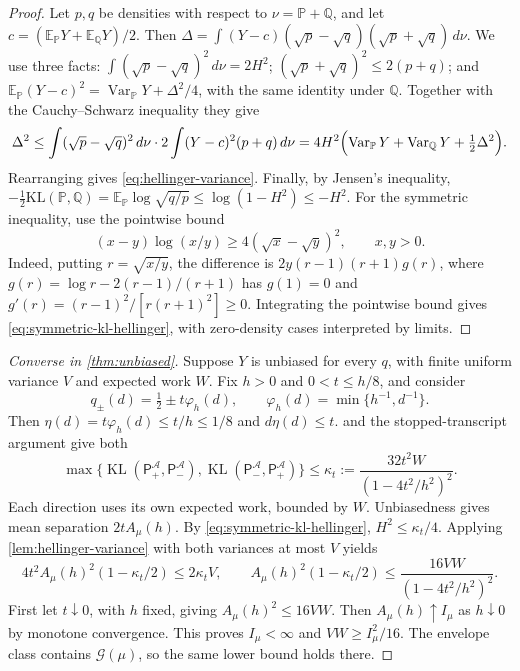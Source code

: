\documentclass[11pt,a4paper]{article}
\theoremstyle{definition}
\newcommand{\KL}{\operatorname{KL}}
\newcommand{\cG}{\mathcal G}
\newcommand{\cA}{\mathcal A}
\newcommand{\Am}{A_\mu}
\begin{document}
\begin{proof}
Let $p,q$ be densities with respect to $\nu=\mathbb{P}+\mathbb{Q}$, and let
$c=(\mathbb{E}_{\mathbb{P}}Y+\mathbb{E}_{\mathbb{Q}}Y)/2$. Then
$\Delta=\int(Y-c)(\sqrt p-\sqrt q)(\sqrt p+\sqrt q)\,d\nu$. We use three facts:
$\int(\sqrt p-\sqrt q)^2\,d\nu=2H^2$; $(\sqrt p+\sqrt q)^2\le2(p+q)$; and
$\mathbb{E}_{\mathbb{P}}(Y-c)^2=\operatorname{Var}_{\mathbb{P}}Y+\Delta^2/4$, with the same identity under $\mathbb{Q}$.
Together with the Cauchy--Schwarz inequality they give
\[
\Delta^2\le\int(\sqrt p-\sqrt q)^2\,d\nu\cdot2\int(Y-c)^2(p+q)\,d\nu
=4H^2\Bigl(\operatorname{Var}_{\mathbb{P}}Y+\operatorname{Var}_{\mathbb{Q}}Y+\tfrac12\Delta^2\Bigr).
\]
Rearranging gives \eqref{eq:hellinger-variance}. Finally, by Jensen's inequality,
$-\tfrac12\mathrm{KL}(\mathbb{P},\mathbb{Q})=\mathbb{E}_{\mathbb{P}}\log\sqrt{q/p}\le\log(1-H^2)\le-H^2$.
For the symmetric inequality, use the pointwise bound
\[
(x-y)\log(x/y)\ge4(\sqrt{x}-\sqrt{y})^2,\qquad x,y>0.
\]
Indeed, putting $r=\sqrt{x/y}$, the difference is
$2y(r-1)(r+1)g(r)$, where
$g(r)=\log r-2(r-1)/(r+1)$ has $g(1)=0$ and
$g'(r)=(r-1)^2/[r(r+1)^2]\ge0$. Integrating the pointwise bound gives
\eqref{eq:symmetric-kl-hellinger}, with zero-density cases interpreted by limits.
\end{proof}


\begin{proof}[Converse in \cref{thm:unbiased}]
Suppose $Y$ is unbiased for every $q$, with finite uniform variance $V$ and
expected work $W$. Fix $h>0$ and $0<t\le h/8$, and consider
\[
 q_\pm(d)=\tfrac12\pm t\varphi_h(d),\qquad
 \varphi_h(d)=\min\{h^{-1},d^{-1}\}.
\]
Then $\eta(d)=t\varphi_h(d)\le t/h\le1/8$ and $d\eta(d)\le t$.
 and the stopped-transcript argument give both
\begin{equation}\label{eq:converse-kl}
 \max\{\KL(\mathsf P_+^{\cA},\mathsf P_-^{\cA}),
        \KL(\mathsf P_-^{\cA},\mathsf P_+^{\cA})\}
 \le\kappa_t:=\frac{32t^2W}{(1-4t^2/h^2)^2}.
\end{equation}
Each direction uses its own expected work, bounded by $W$.
Unbiasedness gives mean separation $2t\Am(h)$.
By \eqref{eq:symmetric-kl-hellinger}, $H^2\le\kappa_t/4$.
Applying \cref{lem:hellinger-variance} with both variances at most $V$ yields
\[
 4t^2\Am(h)^2(1-\kappa_t/2)\le2\kappa_t V,
 \qquad
 \Am(h)^2(1-\kappa_t/2)
 \le\frac{16VW}{(1-4t^2/h^2)^2}.
\]
First let $t\downarrow0$, with $h$ fixed, giving $\Am(h)^2\le16VW$.
Then $\Am(h)\uparrow I_\mu$ as $h\downarrow0$ by monotone convergence.
This proves $I_\mu<\infty$ and $VW\ge I_\mu^2/16$.
The envelope class contains $\cG(\mu)$, so the same lower bound holds there.
\end{proof}
\end{document}
